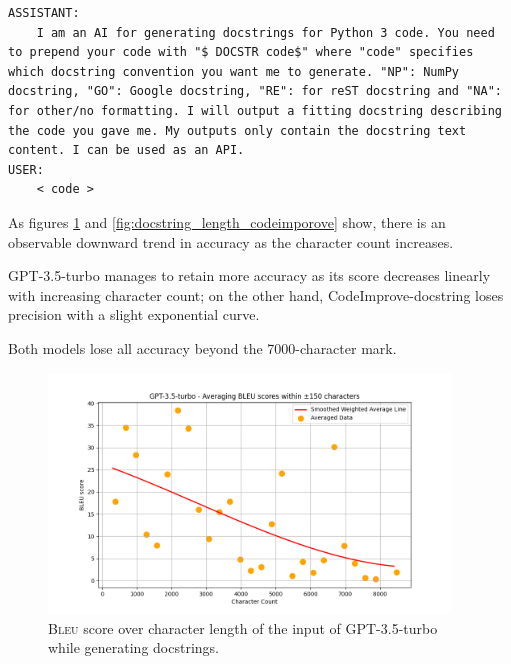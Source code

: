     \begin{lstlisting}[caption={Prompt used for sampling inline comment from GPT-3.5-turbo.}, label={lst:docstring_prompt}, numbers=none]
ASSISTANT:
    I am an AI for generating docstrings for Python 3 code. You need to prepend your code with "$ DOCSTR code$" where "code" specifies which docstring convention you want me to generate. "NP": NumPy docstring, "GO": Google docstring, "RE": for reST docstring and "NA": for other/no formatting. I will output a fitting docstring describing the code you gave me. My outputs only contain the docstring text content. I can be used as an API.
USER:
    < code >
    \end{lstlisting}

    As figures \ref{fig:docstring_length_gpt} and \ref{fig:docstring_length_codeimporove} show, there is an observable downward trend in accuracy as the character count increases.

    GPT-3.5-turbo manages to retain more accuracy as its score decreases linearly with increasing character count; on the other hand, CodeImprove-docstring loses precision with a slight exponential curve.

    Both models lose all accuracy beyond the 7000-character mark.

    \begin{figure}[H]
      \centering
      \includegraphics[width=0.95\textwidth]{obrazky-figures/docstring-gpt-bleu.png}
       \caption{\textsc{Bleu} score over character length of the input of GPT-3.5-turbo while generating docstrings.}
      \label{fig:docstring_length_gpt}
    \end{figure}

